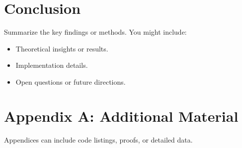 \documentclass[12pt,a4paper]{report}
\begin{document}
\chapter{Conclusion}

Summarize the key findings or methods. You might include:
\begin{itemize}[leftmargin=2em]
    \item Theoretical insights or results.
    \item Implementation details.
    \item Open questions or future directions.
\end{itemize}

\printbibliography

\appendix
\chapter{Appendix A: Additional Material}

Appendices can include code listings, proofs, or detailed data.
\end{document}
